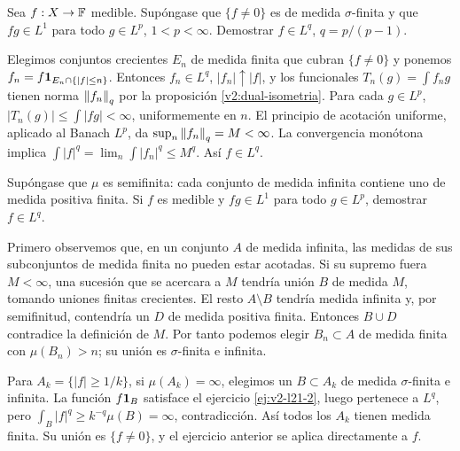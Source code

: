 \begin{ejercicio}\label{ej:v2-l21-2}
Sea $f:X\to\mathbb F$ medible. Supóngase que $\{f\ne0\}$ es de medida $\sigma$-finita y que $fg\in L^1$ para todo $g\in L^p$, $1<p<\infty$. Demostrar $f\in L^q$, $q=p/(p-1)$.
\end{ejercicio}
\begin{solucion}
Elegimos conjuntos crecientes $E_n$ de medida finita que cubran $\{f\ne0\}$ y ponemos $f_n=f\mathbf1_{E_n\cap\{|f|\le n\}}$. Entonces $f_n\in L^q$, $|f_n|\uparrow|f|$, y los funcionales $T_n(g)=\int f_ng$ tienen norma $\left\lVert f_n\right\rVert_q$ por la proposición \ref{v2:dual-isometria}. Para cada $g\in L^p$,
$|T_n(g)|\le\int|fg|<\infty$, uniformemente en $n$. El principio de acotación uniforme, aplicado al Banach $L^p$, da $\sup_n\left\lVert f_n\right\rVert_q=M<\infty$. La convergencia monótona implica $\int|f|^q=\lim_n\int|f_n|^q\le M^q$. Así $f\in L^q$.
\end{solucion}

\begin{ejercicio}\label{ej:v2-l21-3}
Supóngase que $\mu$ es semifinita: cada conjunto de medida infinita contiene uno de medida positiva finita. Si $f$ es medible y $fg\in L^1$ para todo $g\in L^p$, demostrar $f\in L^q$.
\end{ejercicio}
\begin{solucion}
Primero observemos que, en un conjunto $A$ de medida infinita, las medidas de sus subconjuntos de medida finita no pueden estar acotadas. Si su supremo fuera $M<\infty$, una sucesión que se acercara a $M$ tendría unión $B$ de medida $M$, tomando uniones finitas crecientes. El resto $A\setminus B$ tendría medida infinita y, por semifinitud, contendría un $D$ de medida positiva finita. Entonces $B\cup D$ contradice la definición de $M$. Por tanto podemos elegir $B_n\subset A$ de medida finita con $\mu(B_n)>n$; su unión es $\sigma$-finita e infinita.

Para $A_k=\{|f|\ge1/k\}$, si $\mu(A_k)=\infty$, elegimos un $B\subset A_k$ de medida $\sigma$-finita e infinita. La función $f\mathbf1_{B}$ satisface el ejercicio \ref{ej:v2-l21-2}, luego pertenece a $L^q$, pero $\int_B|f|^q\ge k^{-q}\mu(B)=\infty$, contradicción. Así todos los $A_k$ tienen medida finita. Su unión es $\{f\ne0\}$, y el ejercicio anterior se aplica directamente a $f$.
\end{solucion}

